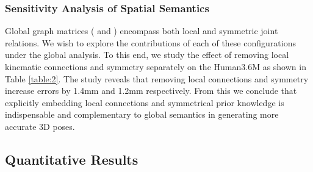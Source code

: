 \documentclass[letterpaper, 10 pt, conference, twoside]{ieeeconf}
\begin{document}
\subsubsection{Sensitivity Analysis of Spatial Semantics}
Global graph matrices ( and ) encompass both local and symmetric joint relations. We wish to explore the contributions of each of these configurations under the global analysis. To this end, we study the effect of removing local kinematic connections  and symmetry  separately on the Human3.6M as shown in Table \ref{table:2}. 
The study reveals that removing local connections and symmetry increase errors by 1.4mm and 1.2mm respectively. From this we conclude that explicitly embedding local connections and symmetrical prior knowledge is indispensable and complementary to global semantics in generating more accurate 3D poses.
\subsection{Quantitative Results}
\end{document}
